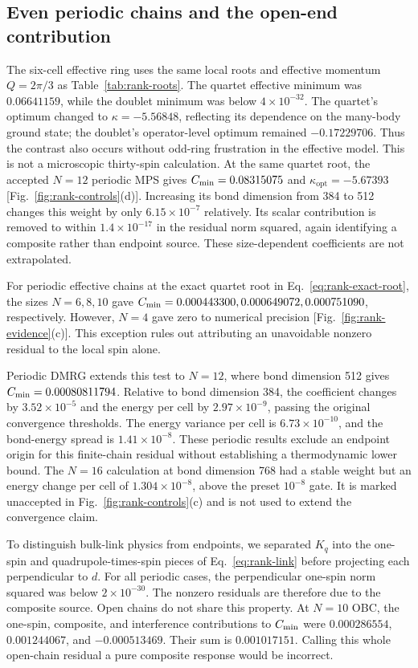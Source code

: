 \subsection{Even periodic chains and the open-end contribution}

The six-cell effective ring uses the same local roots and effective
momentum $Q=2\pi/3$ as Table~\ref{tab:rank-roots}.
The quartet effective minimum was $0.06641159$, while the doublet minimum
was below $4\times10^{-32}$. The quartet's optimum changed to
$\kappa=-5.56848$, reflecting its dependence on the many-body ground state;
the doublet's operator-level optimum remained $-0.17229706$.
Thus the contrast also occurs without odd-ring frustration in the effective
model. This is not a microscopic thirty-spin calculation.
At the same quartet root, the accepted $N=12$ periodic MPS gives
$C_{\mathrm{min}}=0.08315075$ and $\kappa_{\mathrm{opt}}=-5.67393$
[Fig.~\ref{fig:rank-controls}(d)]. Increasing its bond dimension from
384 to 512 changes this weight by only $6.15\times10^{-7}$ relatively.
Its scalar contribution is removed to within $1.4\times10^{-17}$ in
the residual norm squared, again identifying a composite rather than
endpoint source. These size-dependent coefficients are not extrapolated.

For periodic effective chains at the exact quartet root in
Eq.~\eqref{eq:rank-exact-root}, the sizes $N=6,8,10$ gave
$C_{\mathrm{min}}=0.000443300,0.000649072,0.000751090$, respectively.
However, $N=4$ gave zero to numerical precision
[Fig.~\ref{fig:rank-evidence}(c)]. This exception rules out attributing an
unavoidable nonzero residual to the local spin alone.

Periodic DMRG extends this test to $N=12$, where bond dimension 512 gives
$C_{\mathrm{min}}=0.00080811794$. Relative to bond dimension 384, the coefficient
changes by $3.52\times10^{-5}$ and the energy per cell by
$2.97\times10^{-9}$, passing the original convergence thresholds.
The energy variance per cell is $6.73\times10^{-10}$, and the bond-energy
spread is $1.41\times10^{-8}$. These periodic results exclude an endpoint
origin for this finite-chain residual without establishing a thermodynamic
lower bound.
The $N=16$ calculation at bond dimension 768 had a stable weight but an
energy change per cell of $1.304\times10^{-8}$, above the preset
$10^{-8}$ gate. It is marked unaccepted in Fig.~\ref{fig:rank-controls}(c)
and is not used to extend the convergence claim.

To distinguish bulk-link physics from endpoints, we separated $K_q$ into the
one-spin and quadrupole-times-spin pieces of Eq.~\eqref{eq:rank-link} before
projecting each perpendicular to $d$. For all periodic cases, the perpendicular
one-spin norm squared was below $2\times10^{-30}$. The nonzero residuals are
therefore due to the composite source. Open chains do not share this property.
At $N=10$ OBC, the one-spin, composite, and interference contributions to
$C_{\mathrm{min}}$ were $0.000286554$, $0.001244067$, and $-0.000513469$.
Their sum is $0.001017151$. Calling this whole open-chain residual a pure
composite response would be incorrect.

